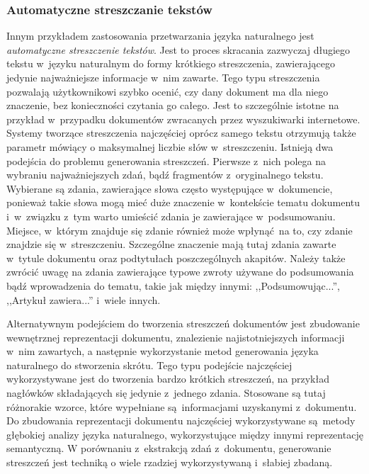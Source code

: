 \documentclass[a4paper, twoside, openright, 12pt]{report}
\begin{document}
            \subsubsection{Automatyczne streszczanie tekstów}
                Innym przykładem zastosowania przetwarzania języka naturalnego jest \emph{automatyczne streszczenie tekstów}.
                Jest to proces skracania zazwyczaj długiego tekstu w~języku naturalnym do formy krótkiego streszczenia,
                zawierającego jedynie najważniejsze informacje w~nim zawarte. Tego typu streszczenia pozwalają
                użytkownikowi szybko ocenić, czy dany dokument ma dla niego znaczenie, bez konieczności czytania go całego.
                Jest to szczególnie istotne na przykład w~przypadku dokumentów zwracanych przez wyszukiwarki internetowe.
                Systemy tworzące streszczenia najczęściej oprócz samego tekstu otrzymują także parametr
                mówiący o maksymalnej liczbie słów w~streszczeniu. Istnieją dwa podejścia do problemu generowania streszczeń.
                Pierwsze z~nich polega na wybraniu najważniejszych zdań, bądź fragmentów z~oryginalnego tekstu. Wybierane
                są zdania, zawierające słowa często występujące w~dokumencie, ponieważ takie słowa mogą mieć duże znaczenie
                w~kontekście tematu dokumentu i~w~związku z~tym warto umieścić zdania je zawierające w~podsumowaniu. Miejsce,
                w~którym znajduje się zdanie również może wpłynąć na to, czy zdanie znajdzie się w~streszczeniu. Szczególne
                znaczenie mają tutaj zdania zawarte w~tytule dokumentu oraz podtytułach poszczególnych akapitów. Należy
                także zwrócić uwagę na zdania zawierające typowe zwroty używane do podsumowania bądź wprowadzenia do tematu,
                takie jak między innymi: ,,Podsumowując...'', ,,Artykuł zawiera...'' i~wiele innych.

                Alternatywnym podejściem do tworzenia streszczeń dokumentów jest zbudowanie wewnętrznej reprezentacji
                dokumentu, znalezienie najistotniejszych informacji w~nim zawartych, a następnie wykorzystanie metod
                generowania języka naturalnego do stworzenia skrótu. Tego typu podejście najczęściej wykorzystywane jest
                do tworzenia bardzo krótkich streszczeń, na przykład nagłówków składających się jedynie z~jednego zdania.
                Stosowane są tutaj różnorakie wzorce, które wypełniane są informacjami uzyskanymi z~dokumentu. Do zbudowania
                reprezentacji dokumentu najczęściej wykorzystywane są metody głębokiej analizy języka naturalnego,
                wykorzystujące między innymi reprezentację semantyczną. W porównaniu z~ekstrakcją zdań z~dokumentu, generowanie
                streszczeń jest techniką o wiele rzadziej wykorzystywaną i~słabiej zbadaną\cite{SUMMARIZATIONOVERVIEW}.
\end{document}
